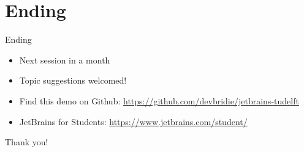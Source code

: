 \documentclass{beamer}
\begin{document}
\section{Ending}
\begin{frame}{Ending}
\begin{itemize}
    \item Next session in a month
    \item Topic suggestions welcomed!
    \item Find this demo on Github: \url{https://github.com/devbridie/jetbrains-tudelft}
    \item JetBrains for Students: \url{https://www.jetbrains.com/student/}
\end{itemize}
\end{frame}

\begin{frame}{Thank you!}
\end{frame}
\end{document}
